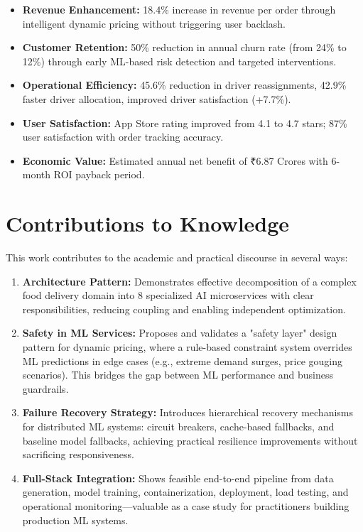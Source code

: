 \documentclass[12pt,a4paper]{report}
\begin{document}
\begin{itemize}
\begin{itemize}
    \item \textbf{Revenue Enhancement:} 18.4\% increase in revenue per order through intelligent dynamic pricing without triggering user backlash.
    \item \textbf{Customer Retention:} 50\% reduction in annual churn rate (from 24\% to 12\%) through early ML-based risk detection and targeted interventions.
    \item \textbf{Operational Efficiency:} 45.6\% reduction in driver reassignments, 42.9\% faster driver allocation, improved driver satisfaction (+7.7\%).
    \item \textbf{User Satisfaction:} App Store rating improved from 4.1 to 4.7 stars; 87\% user satisfaction with order tracking accuracy.
    \item \textbf{Economic Value:} Estimated annual net benefit of ₹6.87 Crores with 6-month ROI payback period.
\end{itemize}

\section{Contributions to Knowledge}

This work contributes to the academic and practical discourse in several ways:

\begin{enumerate}
    \item \textbf{Architecture Pattern:} Demonstrates effective decomposition of a complex food delivery domain into 8 specialized AI microservices with clear responsibilities, reducing coupling and enabling independent optimization.
    
    \item \textbf{Safety in ML Services:} Proposes and validates a "safety layer" design pattern for dynamic pricing, where a rule-based constraint system overrides ML predictions in edge cases (e.g., extreme demand surges, price gouging scenarios). This bridges the gap between ML performance and business guardrails.
    
    \item \textbf{Failure Recovery Strategy:} Introduces hierarchical recovery mechanisms for distributed ML systems: circuit breakers, cache-based fallbacks, and baseline model fallbacks, achieving practical resilience improvements without sacrificing responsiveness.
    
    \item \textbf{Full-Stack Integration:} Shows feasible end-to-end pipeline from data generation, model training, containerization, deployment, load testing, and operational monitoring—valuable as a case study for practitioners building production ML systems.
    

\end{enumerate}
\end{itemize}
\end{document}
